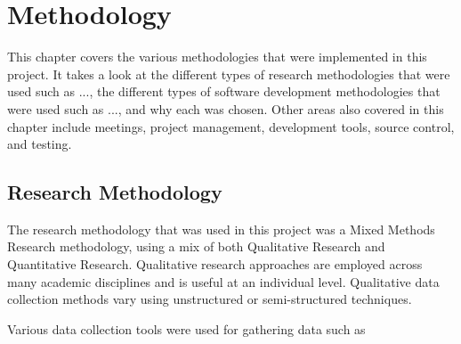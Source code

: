 \chapter{Methodology}
This chapter covers the various methodologies that were implemented in this project. It takes a look at the different types of research methodologies that were used such as ..., the different types of software development methodologies that were used such as ..., and why each was chosen. Other areas also covered in this chapter include meetings, project management, development tools, source control, and testing.

\section{Research Methodology}
The research methodology that was used in this project was a Mixed Methods Research methodology, using a mix of both Qualitative Research and Quantitative Research. Qualitative research approaches are employed across many academic disciplines and is useful at an individual level. Qualitative data collection methods vary using unstructured or semi-structured techniques.
\par
\medskip
Various data collection tools were used for gathering data such as

